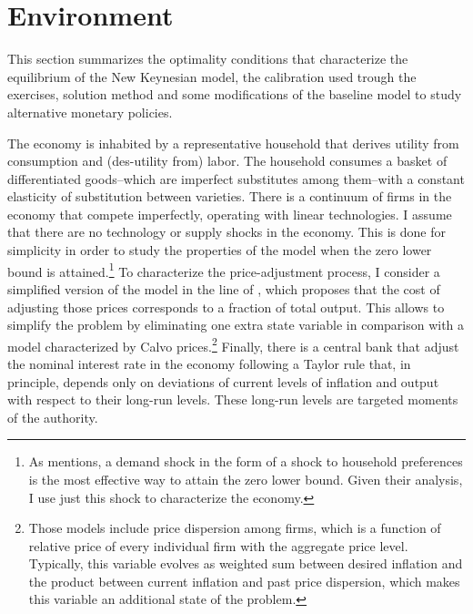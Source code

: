 \documentclass[12pt]{article}
\numberwithin{equation}{section}
\begin{document}
\section{Environment}\label{sec:model}

This section summarizes the optimality conditions that characterize the equilibrium of the New Keynesian model, the calibration used trough the exercises, solution method and some modifications of the baseline model to study alternative monetary policies. 

The economy is inhabited by a representative household that derives utility from consumption and (des-utility from) labor. The household consumes a basket of differentiated goods--which are imperfect substitutes among them--with a constant elasticity of substitution between varieties. There is a continuum of firms in the economy that compete imperfectly, operating with linear technologies. I assume that there are no technology or supply shocks in the economy. This is done for simplicity in order to study the properties of the model when the zero lower bound is attained.\footnote{As \cite{Fernandez-VillaverdeEtAl2015} mentions, a demand shock in the form of a shock to household preferences is the most effective way to attain the zero lower bound. Given their analysis, I use just this shock to characterize the economy.} To characterize the price-adjustment process, I consider a simplified version of the model in the line of \cite{Rotemberg1982}, which proposes that the cost of adjusting those prices corresponds to a fraction of total output. This allows to simplify the problem by eliminating one extra state variable in comparison with a model characterized by Calvo prices.\footnote{Those models include price dispersion among firms, which is a function of relative price of every individual firm with the aggregate price level. Typically, this variable evolves as weighted sum between desired inflation and the product between current inflation and past price dispersion, which makes this variable an additional state of the problem.} Finally, there is a central bank that adjust the nominal interest rate in the economy following a Taylor rule that, in principle, depends only on deviations of current levels of inflation and output with respect to their long-run levels. These long-run levels are targeted moments of the authority. 
\end{document}
